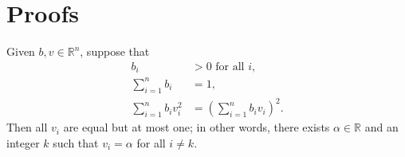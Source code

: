 \section{Proofs}\label{appendixA}

\begin{lemma}\label{Davids_lemma}
	Given $b,v \in \mathbb{R}^{n}$, suppose that
    \begin{subequations}\label{eq:DavidsLemma}
    		\begin{align}
    			b_i & > 0 \mbox{ for all } i, \label{eq:DavidsLemma_a} \\
    			\sum_{i=1}^n b_i & = 1, \label{eq:DavidsLemma_b} \\
    			\sum_{i=1}^n b_i v_i^2 & = \left(\sum_{i=1}^n b_i v_i \right)^2. \label{eq:DavidsLemma_c}
    		\end{align}
    	\end{subequations}
    	Then all $v_i$ are equal but at most one; in other words, there exists $\alpha \in \mathbb{R}$ and an integer $k$ such that $v_i = \alpha$ for all $i \ne k$.
\end{lemma}

